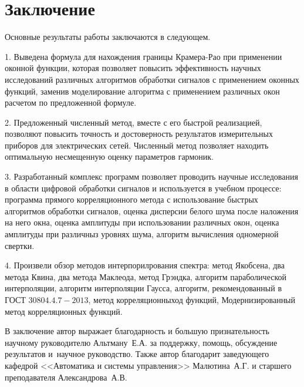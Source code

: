 \chapter*{Заключение}                       %


Основные результаты работы заключаются в следующем.
%

1. Выведена формула для нахождения границы Крамера-Рао при применении оконной функции, которая позволяет повысить эффективность научных исследований различных алгоритмов обработки сигналов с применением оконных функций, заменив моделирование алгоритма с применением различных окон расчетом по предложенной формуле.

2.	Предложенный численный метод, вместе с его быстрой реализацией, позволяют повысить точность и достоверность результатов измерительных приборов для электрических сетей. Численный метод позволяет находить оптимальную несмещенную оценку параметров гармоник.

3.	Разработанный комплекс программ позволяет проводить научные исследования в области цифровой обработки сигналов и используется в учебном процессе: программа прямого корреляционного метода с использование быстрых алгоритмов обработки сигналов, оценка дисперсии белого шума после наложения на него окна, оценка амплитуды при использовании различных окон, оценка амплитуды при различныз уровнях шума, алгоритм вычисления одномерной свертки.

4. Произвели обзор методов интерпорилрования спектра: метод Якобсена, два метода Квина, два метода Маклеода, метод Грэндка, алгоритм параболической интерполяции, алгоритм интерполяции Гаусса, алгоритм, рекомендованный в ГОСТ $30804.4.7-2013$, метод корреляционныход  функций, Модернизированный метод корреляционных функций.   

В заключение автор выражает благодарность и большую признательность научному руководителю Альтману~Е.\:А. за поддержку, помощь, обсуждение результатов и~научное руководство. Также автор благодарит заведующего кафедрой <<Автоматика и системы управления>> Малютина~А.\:Г. и старшего преподавателя Александрова~А.\:В.


